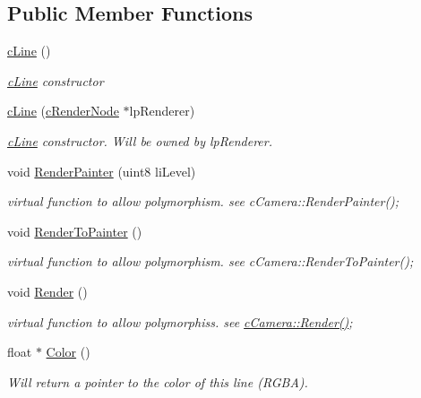 \subsection*{Public Member Functions}
\begin{DoxyCompactItemize}
\item 
\hyperlink{classc_line_afc96602bef17f3d03af9685532af395d}{cLine} ()
\begin{DoxyCompactList}\small\item\em \hyperlink{classc_line}{cLine} constructor \item\end{DoxyCompactList}\item 
\hyperlink{classc_line_ab764b0513fe512fdaa5c582503b1f695}{cLine} (\hyperlink{classc_render_node}{cRenderNode} $\ast$lpRenderer)
\begin{DoxyCompactList}\small\item\em \hyperlink{classc_line}{cLine} constructor. Will be owned by lpRenderer. \item\end{DoxyCompactList}\item 
void \hyperlink{classc_line_a5c5189a48b0e55c436d98aaed184ccc8}{RenderPainter} (uint8 liLevel)
\begin{DoxyCompactList}\small\item\em virtual function to allow polymorphism. see cCamera::RenderPainter(); \item\end{DoxyCompactList}\item 
void \hyperlink{classc_line_a0e06d47dcc732da35dd1575ddc6c894e}{RenderToPainter} ()
\begin{DoxyCompactList}\small\item\em virtual function to allow polymorphism. see cCamera::RenderToPainter(); \item\end{DoxyCompactList}\item 
void \hyperlink{classc_line_af7852492bb5da5f32310675342fa12e7}{Render} ()
\begin{DoxyCompactList}\small\item\em virtual function to allow polymorphiss. see \hyperlink{classc_camera_acfe96d0953540fa3938e4d415d7cb791}{cCamera::Render()}; \item\end{DoxyCompactList}\item 
float $\ast$ \hyperlink{classc_line_a7f62c7d19b3c7c1f8857bbf27a968db6}{Color} ()
\begin{DoxyCompactList}\small\item\em Will return a pointer to the color of this line (RGBA). \item\end{DoxyCompactList}\item 

\end{DoxyCompactItemize}
